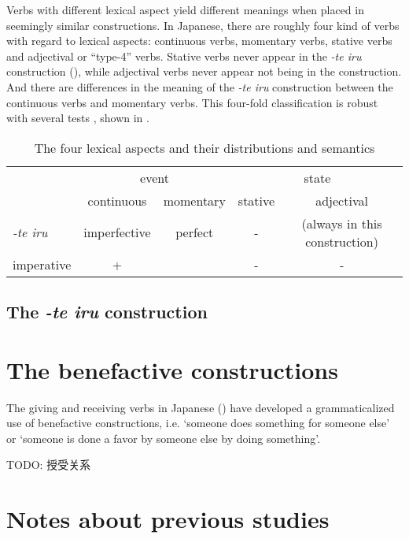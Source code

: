 \documentclass[UTF8, a4paper, oneside, scheme=plain]{ctexrep}
\newcommand*{\citesec}[1]{\S~{#1}}
\newcommand{\corpus}[1]{\emph{#1}}
\newcommand{\translate}[1]{`#1'}
\begin{document}
Verbs with different lexical aspect yield different meanings 
when placed in seemingly similar constructions.
In Japanese, there are roughly four kind of verbs with regard to lexical aspects:
continuous verbs, momentary verbs, stative verbs and adjectival or ``type-4'' verbs.
Stative verbs never appear in the \corpus{-te iru} construction (),
while adjectival verbs never appear not being in the construction.
And there are differences in the meaning of the \corpus{-te iru} construction 
between the continuous verbs and momentary verbs.
This four-fold classification is robust with several tests \citep[\citesec{3.1}]{gu2004},
shown in .

\begin{table}[H]
    \centering
    \caption{The four lexical aspects and their distributions and semantics}
    \label{tbl:lexical-aspect}
    \begin{tabular}{lcccc}
        \toprule
                     & \multicolumn{2}{c}{event} & \multicolumn{2}{c}{state} \\
                     & continuous    & momentary & stative    & adjectival   \\ \midrule
    \corpus{-te iru} & imperfective  & perfect   & -          & (always in this construction)       \\ 
    imperative       & +             &           & -          & -             \\  \bottomrule
    \end{tabular}
\end{table}

\subsection{The \corpus{-te iru} construction}\label{sec:te-iru}

\section{The benefactive constructions}

The giving and receiving verbs in Japanese () 
have developed a grammaticalized use of benefactive constructions,
i.e. \translate{someone does something for someone else}
or \translate{someone is done a favor by someone else by doing something}.

TODO: 授受关系


\section{Notes about previous studies}\label{sec:verb-complex-previous}
\end{document}
